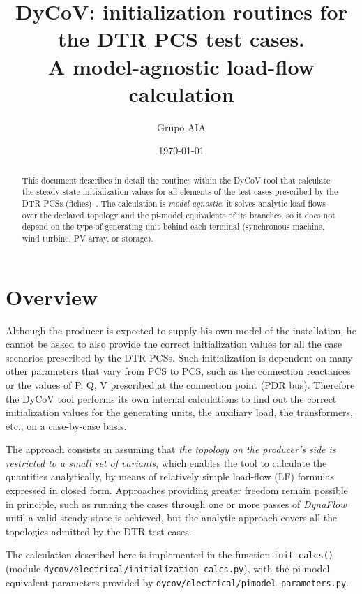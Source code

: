 \documentclass[a4paper,11pt]{article}
\title{DyCoV: initialization routines for the DTR PCS test cases.\\
  \large A model-agnostic load-flow calculation}
\author{Grupo AIA}
\date{
  \today
}
\newcommand{\code}[1]{\texttt{#1}}  %
\begin{document}
\maketitle
\tableofcontents

\begin{abstract}
  This document describes in detail the routines within the DyCoV tool that calculate
  the steady-state initialization values for all elements of the test cases prescribed
  by the DTR PCSs (fiches)~\cite{DTRhome}. The calculation is \emph{model-agnostic}: it
  solves analytic load flows over the declared topology and the pi-model equivalents of
  its branches, so it does not depend on the type of generating unit behind each
  terminal (synchronous machine, wind turbine, PV array, or storage).
\end{abstract}





\section{Overview}

Although the producer is expected to supply his own model of the installation, he
cannot be asked to also provide the correct initialization values for all the case
scenarios prescribed by the DTR PCSs. Such initialization is dependent on many other
parameters that vary from PCS to PCS, such as the connection reactances or the values of
P, Q, V prescribed at the connection point (PDR bus). Therefore the DyCoV tool performs
its own internal calculations to find out the correct initialization values for the
generating units, the auxiliary load, the transformers, etc.; on a case-by-case basis.

The approach consists in assuming that \emph{the topology on the producer's side is
  restricted to a small set of variants}, which enables the tool to calculate the
quantities analytically, by means of relatively simple load-flow (LF) formulas expressed
in closed form. Approaches providing greater freedom remain possible in principle, such
as running the cases through one or more passes of \emph{DynaFlow}~\cite{Dynawo} until a
valid steady state is achieved, but the analytic approach covers all the topologies
admitted by the DTR test cases.

The calculation described here is implemented in the function \code{init\_calcs()}
(module \code{dycov/electrical/initialization\_calcs.py}), with the pi-model equivalent
parameters provided by \code{dycov/electrical/pimodel\_parameters.py}.
\end{document}
